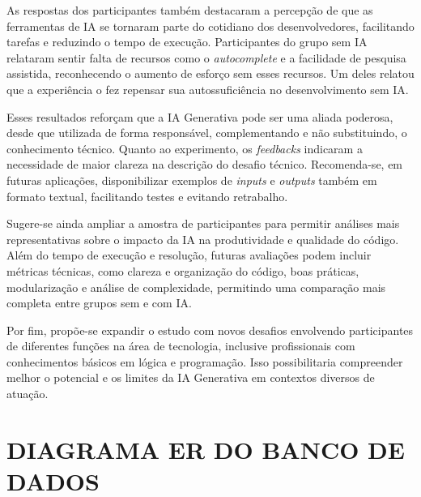 \documentclass[english,brazilian]{UNISINOSartigo} %
\begin{document}
As respostas dos participantes também destacaram a percepção de que as ferramentas de IA se tornaram parte do cotidiano dos desenvolvedores, facilitando tarefas e reduzindo o tempo de execução. Participantes do grupo sem IA relataram sentir falta de recursos como o \textit{autocomplete} e a facilidade de pesquisa assistida, reconhecendo o aumento de esforço sem esses recursos. Um deles relatou que a experiência o fez repensar sua autossuficiência no desenvolvimento sem IA.

Esses resultados reforçam que a IA Generativa pode ser uma aliada poderosa, desde que utilizada de forma responsável, complementando e não substituindo, o conhecimento técnico. Quanto ao experimento, os \textit{feedbacks} indicaram a necessidade de maior clareza na descrição do desafio técnico. Recomenda-se, em futuras aplicações, disponibilizar exemplos de \textit{inputs} e \textit{outputs} também em formato textual, facilitando testes e evitando retrabalho.

Sugere-se ainda ampliar a amostra de participantes para permitir análises mais representativas sobre o impacto da IA na produtividade e qualidade do código. Além do tempo de execução e resolução, futuras avaliações podem incluir métricas técnicas, como clareza e organização do código, boas práticas, modularização e análise de complexidade, permitindo uma comparação mais completa entre grupos sem e com IA.

Por fim, propõe-se expandir o estudo com novos desafios envolvendo participantes de diferentes funções na área de tecnologia, inclusive profissionais com conhecimentos básicos em lógica e programação. Isso possibilitaria compreender melhor o potencial e os limites da IA Generativa em contextos diversos de atuação.



\appendix
\section{DIAGRAMA ER DO BANCO DE DADOS}

\renewcommand{\thefigure}{A.\arabic{figure}}
\setcounter{figure}{0}
\end{document}
